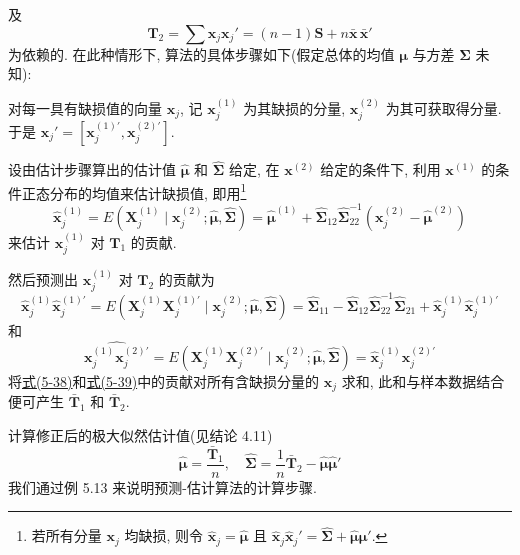 及
\[
\mathbf{T}_2=\sum \mathbf{x}_j\mathbf{x}_j'=(n-1)\mathbf{S}+n\bar{\mathbf{x}}\,\bar{\mathbf{x}}'
\]
为依赖的. 在此种情形下, 算法的具体步骤如下(假定总体的均值 $\boldsymbol{\mu}$ 与方差 $\boldsymbol{\Sigma}$ 未知):

\quad 对每一具有缺损值的向量 $\mathbf{x}_j$, 记 $\mathbf{x}_j^{(1)}$ 为其缺损的分量, $\mathbf{x}_j^{(2)}$ 为其可获取得分量. 于是 $\mathbf{x}_j'=[\mathbf{x}_j^{(1)'},\mathbf{x}_j^{(2)'}]$.

设由估计步骤算出的估计值 $\hat{\boldsymbol{\mu}}$ 和 $\hat{\boldsymbol{\Sigma}}$ 给定, 在 $\mathbf{x}^{(2)}$ 给定的条件下, 利用 $\mathbf{x}^{(1)}$ 的条件正态分布的均值来估计缺损值, 即用\footnote{若所有分量 $\mathbf{x}_j$ 均缺损, 则令 $\hat{\mathbf{x}}_j=\hat{\boldsymbol{\mu}}$ 且 $\hat{\mathbf{x}}_j\hat{\mathbf{x}}_j'=\hat{\boldsymbol{\Sigma}}+\hat{\boldsymbol{\mu}}\hat{\boldsymbol{\mu}}'$.}
\label{eq:5-38}
\begin{equation}
\hat{\mathbf{x}}_j^{(1)}=E(\mathbf{X}_j^{(1)}\mid\mathbf{x}_j^{(2)};\hat{\boldsymbol{\mu}},\hat{\boldsymbol{\Sigma}})
=\hat{\boldsymbol{\mu}}^{(1)}+\hat{\boldsymbol{\Sigma}}_{12}\hat{\boldsymbol{\Sigma}}_{22}^{-1}(\mathbf{x}_j^{(2)}-\hat{\boldsymbol{\mu}}^{(2)}) \tag{5-38}
\end{equation}
来估计 $\mathbf{x}_j^{(1)}$ 对 $\mathbf{T}_1$ 的贡献.

然后预测出 $\mathbf{x}_j^{(1)}$ 对 $\mathbf{T}_2$ 的贡献为
\label{eq:5-39}
\begin{equation}
\hat{\mathbf{x}}_j^{(1)}\hat{\mathbf{x}}_j^{(1)'}=E(\mathbf{X}_j^{(1)}\mathbf{X}_j^{(1)'}\mid\mathbf{x}_j^{(2)};\hat{\boldsymbol{\mu}},\hat{\boldsymbol{\Sigma}})
=\hat{\boldsymbol{\Sigma}}_{11}-\hat{\boldsymbol{\Sigma}}_{12}\hat{\boldsymbol{\Sigma}}_{22}^{-1}\hat{\boldsymbol{\Sigma}}_{21}
+\hat{\mathbf{x}}_j^{(1)}\hat{\mathbf{x}}_j^{(1)'} \tag{5-39}
\end{equation}
和
\[
\widehat{\mathbf{x}_j^{(1)}\mathbf{x}_j^{(2)'}}=E(\mathbf{X}_j^{(1)}\mathbf{X}_j^{(2)'}\mid\mathbf{x}_j^{(2)};\hat{\boldsymbol{\mu}},\hat{\boldsymbol{\Sigma}})
=\hat{\mathbf{x}}_j^{(1)}\mathbf{x}_j^{(2)'}
\]
将\hyperref[eq:5-38]{式(5-38)}和\hyperref[eq:5-39]{式(5-39)}中的贡献对所有含缺损分量的 $\mathbf{x}_j$ 求和, 此和与样本数据结合便可产生 $\bar{\mathbf{T}}_1$ 和 $\bar{\mathbf{T}}_2$.

\quad 计算修正后的极大似然估计值(见结论 4.11)
\label{eq:5-40}
\begin{equation}
\hat{\boldsymbol{\mu}}=\frac{\bar{\mathbf{T}}_1}{n}, \quad
\hat{\boldsymbol{\Sigma}}=\frac{1}{n}\bar{\mathbf{T}}_2-\hat{\boldsymbol{\mu}}\hat{\boldsymbol{\mu}}' \tag{5-40}
\end{equation}
我们通过例 5.13 来说明预测-估计算法的计算步骤.

